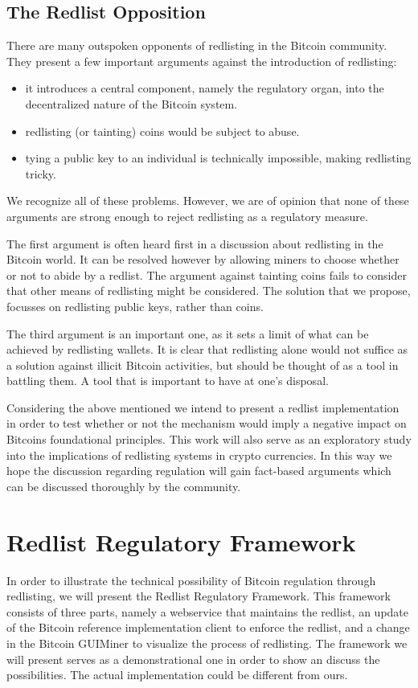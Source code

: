\documentclass[12pt,journal,compsoc]{IEEEtran}
\begin{document}
\subsection{The Redlist Opposition}
There are many outspoken opponents of redlisting in the Bitcoin community.
They present a few important arguments against the introduction of redlisting:

\begin{itemize}
  \item it introduces a central component, namely the regulatory organ, into the decentralized
    nature of the Bitcoin system.

  \item redlisting (or tainting) coins would be subject to abuse.

  \item tying a public key to an individual is technically impossible, making redlisting tricky.
\end{itemize}

We recognize all of these problems.
However, we are of opinion that none of these arguments are strong enough to reject redlisting as a
regulatory measure.

The first argument is often heard first in a discussion about redlisting in the Bitcoin world.
It can be resolved however by allowing miners to choose whether or not to abide by a redlist.
The argument against tainting coins fails to consider that other means of redlisting might be
considered.
The solution that we propose, focusses on redlisting public keys, rather than coins.

The third argument is an important one, as it sets a limit of what can be achieved by redlisting
wallets.
It is clear that redlisting alone would not suffice as a solution against illicit Bitcoin
activities, but should be thought of as a tool in battling them.
A tool that is important to have at one's disposal.

Considering the above mentioned we intend to present a redlist implementation in order to test whether or not the mechanism would imply a negative impact on Bitcoins foundational principles. This work will also serve as an exploratory study into the implications of redlisting systems in crypto currencies. In this way we hope the discussion regarding regulation will gain fact-based arguments which can be discussed thoroughly by the community.


\section{Redlist Regulatory Framework}
In order to illustrate the technical possibility of Bitcoin regulation through redlisting, we will present the Redlist Regulatory Framework. This framework consists of three parts, namely a webservice that maintains the redlist, an update of the Bitcoin reference implementation client to enforce the redlist, and a change in the Bitcoin GUIMiner to visualize the process of redlisting. The framework we will present serves as a demonstrational one in order to show an discuss the possibilities. The actual implementation could be different from ours.
\end{document}
